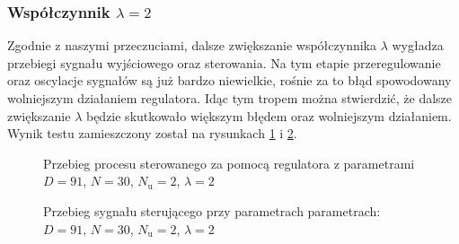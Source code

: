 \subsubsection{Współczynnik $\lambda = 2$}
Zgodnie z naszymi przeczuciami, dalsze zwiększanie współczynnika $\lambda$ wygładza przebiegi sygnału wyjściowego oraz sterowania. Na tym etapie przeregulowanie oraz oscylacje sygnałów są już bardzo niewielkie, rośnie za to błąd spowodowany wolniejszym działaniem regulatora. Idąc tym tropem można stwierdzić, że dalsze zwiększanie $\lambda$ będzie skutkowało większym błędem oraz wolniejszym działaniem. Wynik testu zamieszczony został na rysunkach \ref{dmc_lam_2_y} i \ref{dmc_lam_2_u}.

\begin{figure}[t]
    \centering
    \caption{Przebieg procesu sterowanego za pomocą regulatora z parametrami $D = 91$, $N = 30$, $N_{\mathrm{u}} = 2$, $\lambda = 2$}
    \label{dmc_lam_2_y}
\end{figure}

\begin{figure}[b]
    \centering
    \caption{Przebieg sygnału sterującego przy parametrach parametrach: $D = 91$, $N = 30$, $N_{\mathrm{u}} = 2$, $\lambda = 2$}
    \label{dmc_lam_2_u}
\end{figure}

